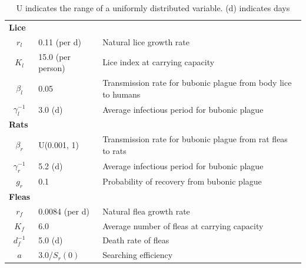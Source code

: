 \documentclass [letterpaper, 12pt] {article}
\begin{document}
\begin{table}[H]
{\begin{tabular}{|c|l|l|}
			\multicolumn{1}{|l|}{\textbf{Lice}}      &                                     &                                                                                 \\
			$r_l$                                    & 0.11 (per d)                        & Natural lice growth rate                                                        \\
			$K_l$                                    & 15.0 (per person)                   & Lice index at carrying capacity                                                 \\
			$\beta_l$                                & 0.05                                & Transmission rate for bubonic plague from body lice to humans                   \\
			$\gamma_l^{-1}$                          & 3.0 (d)                             & Average infectious period for bubonic plague                                    \\ \hline
			\multicolumn{1}{|l|}{\textbf{Rats}}      &                                     &                                                                                 \\
			$\beta_r$                                & U(0.001, 1)                         & Transmission rate for bubonic plague from rat fleas to rats                     \\
			$\gamma_r^{-1}$                          & 5.2 (d)                             & Average infectious period for bubonic plague                                    \\
			$g_r$                                    & 0.1                                 & Probability of recovery from bubonic plague                                     \\ \hline
			\multicolumn{1}{|l|}{\textbf{Fleas}}     &                                     &                                                                                 \\
			$r_f$                                    & 0.0084 (per d)                      & Natural flea growth rate                                                        \\
			$K_f$                                    & 6.0                                 & Average number of fleas at carrying capacity                                    \\
			$d_f^{-1}$                               & 5.0 (d)                             & Death rate of fleas                                                             \\
			$a$                                      & 3.0/$S_r(0)$                        & Searching efficiency                                                            \\ \hline
		\end{tabular}%
	}
	\caption{U indicates the range of a uniformly distributed variable. (d) indicates days}
\end{table}
\end{document}
